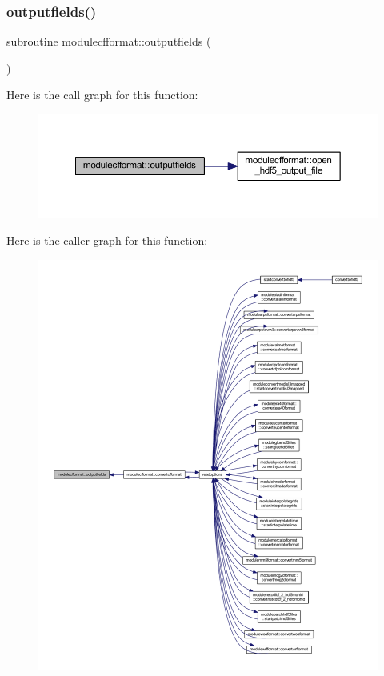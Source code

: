 \subsubsection{\texorpdfstring{outputfields()}{outputfields()}}
{\footnotesize\ttfamily subroutine modulecfformat\+::outputfields (\begin{DoxyParamCaption}{ }\end{DoxyParamCaption})\hspace{0.3cm}{\ttfamily [private]}}

Here is the call graph for this function\+:\nopagebreak
\begin{figure}[H]
\begin{center}
\leavevmode
\includegraphics[width=350pt]{namespacemodulecfformat_a369a14cc96dd6826942c93e6352240db_cgraph}
\end{center}
\end{figure}
Here is the caller graph for this function\+:\nopagebreak
\begin{figure}[H]
\begin{center}
\leavevmode
\includegraphics[width=350pt]{namespacemodulecfformat_a369a14cc96dd6826942c93e6352240db_icgraph}
\end{center}
\end{figure}
\mbox{\label{namespacemodulecfformat_a76cf49362d3cf1651d95e683370014a6}} 

